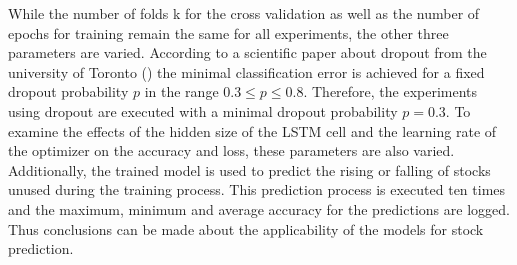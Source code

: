 While the number of folds k for the cross validation as well as the number of epochs for training remain the same for all experiments, the other three parameters are varied. According to a scientific paper about dropout from the university of Toronto (\cite{Srivastava:2014:DSW:2627435.2670313}) the minimal classification error is achieved for a fixed dropout probability $p$ in the range $0.3 \le p \le 0.8$. Therefore, the experiments using dropout are executed with a minimal dropout probability $p = 0.3$. To examine the effects of the hidden size of the LSTM cell and the learning rate of the optimizer on the accuracy and loss, these parameters are also varied. 
\\
Additionally, the trained model is used to predict the rising or falling of stocks unused during the training process. This prediction process is executed ten times and the maximum, minimum and average accuracy for the predictions are logged. Thus conclusions can be made about the applicability of the models for stock prediction. 

